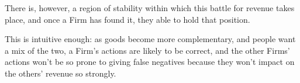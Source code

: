There is, however, a region of stability within which this battle for revenue takes place, and once a Firm has found it, they able to hold that position.





This is intuitive enough: as goods become more complementary, and people want a mix of the two, a Firm's actions are likely to be correct, and the other Firms' actions won't be so prone to giving false negatives because they won't impact on the others' revenue so strongly.